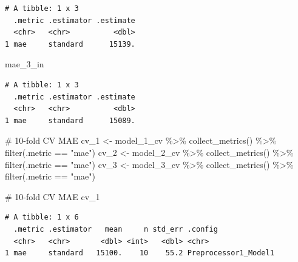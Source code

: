 \documentclass[
  letterpaper,
  DIV=11,
  numbers=noendperiod]{scrartcl}
\newenvironment{Shaded}{\begin{snugshade}}{\end{snugshade}}
\newcommand{\CommentTok}[1]{\textcolor[rgb]{0.37,0.37,0.37}{#1}}
\newcommand{\FunctionTok}[1]{\textcolor[rgb]{0.28,0.35,0.67}{#1}}
\newcommand{\NormalTok}[1]{\textcolor[rgb]{0.00,0.23,0.31}{#1}}
\newcommand{\OtherTok}[1]{\textcolor[rgb]{0.00,0.23,0.31}{#1}}
\newcommand{\SpecialCharTok}[1]{\textcolor[rgb]{0.37,0.37,0.37}{#1}}
\newcommand{\StringTok}[1]{\textcolor[rgb]{0.13,0.47,0.30}{#1}}
\begin{document}
\begin{verbatim}
# A tibble: 1 x 3
  .metric .estimator .estimate
  <chr>   <chr>          <dbl>
1 mae     standard      15139.
\end{verbatim}

\begin{Shaded}
\begin{Highlighting}[]
\NormalTok{mae\_3\_in}
\end{Highlighting}
\end{Shaded}

\begin{verbatim}
# A tibble: 1 x 3
  .metric .estimator .estimate
  <chr>   <chr>          <dbl>
1 mae     standard      15089.
\end{verbatim}

\begin{Shaded}
\begin{Highlighting}[]
\CommentTok{\# 10{-}fold CV MAE}
\NormalTok{cv\_1 }\OtherTok{\textless{}{-}}\NormalTok{ model\_1\_cv }\SpecialCharTok{\%\textgreater{}\%} \FunctionTok{collect\_metrics}\NormalTok{() }\SpecialCharTok{\%\textgreater{}\%} \FunctionTok{filter}\NormalTok{(.metric }\SpecialCharTok{==} \StringTok{"mae"}\NormalTok{)}
\NormalTok{cv\_2 }\OtherTok{\textless{}{-}}\NormalTok{ model\_2\_cv }\SpecialCharTok{\%\textgreater{}\%} \FunctionTok{collect\_metrics}\NormalTok{() }\SpecialCharTok{\%\textgreater{}\%} \FunctionTok{filter}\NormalTok{(.metric }\SpecialCharTok{==} \StringTok{"mae"}\NormalTok{)}
\NormalTok{cv\_3 }\OtherTok{\textless{}{-}}\NormalTok{ model\_3\_cv }\SpecialCharTok{\%\textgreater{}\%} \FunctionTok{collect\_metrics}\NormalTok{() }\SpecialCharTok{\%\textgreater{}\%} \FunctionTok{filter}\NormalTok{(.metric }\SpecialCharTok{==} \StringTok{"mae"}\NormalTok{)}
\end{Highlighting}
\end{Shaded}

\begin{Shaded}
\begin{Highlighting}[]
\CommentTok{\# 10{-}fold CV MAE}
\NormalTok{cv\_1 }
\end{Highlighting}
\end{Shaded}

\begin{verbatim}
# A tibble: 1 x 6
  .metric .estimator   mean     n std_err .config             
  <chr>   <chr>       <dbl> <int>   <dbl> <chr>               
1 mae     standard   15100.    10    55.2 Preprocessor1_Model1
\end{verbatim}
\end{document}
